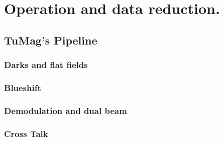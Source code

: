\chapter{\label{CH:Pipeline}Operation and data reduction.}

\section{TuMag's Pipeline}

\subsection{Darks and flat fields}
\subsection{Blueshift}
\subsection{Demodulation and dual beam}
\subsection{Cross Talk}

